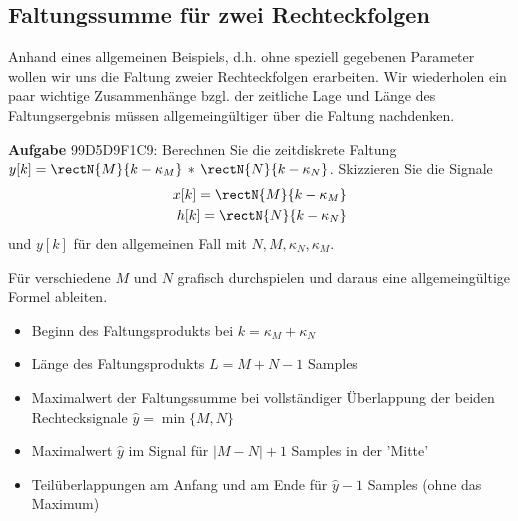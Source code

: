 \subsection{Faltungssumme für zwei Rechteckfolgen}
\label{sec:99D5D9F1C9}
\begin{Ziel}
Anhand eines allgemeinen Beispiels, d.h. ohne speziell gegebenen Parameter
wollen wir uns die Faltung zweier Rechteckfolgen erarbeiten.
Wir wiederholen ein paar wichtige Zusammenhänge bzgl. der zeitliche Lage und
Länge des Faltungsergebnis müssen allgemeingültiger über die Faltung nachdenken.
\end{Ziel}
\textbf{Aufgabe} {\tiny 99D5D9F1C9}: Berechnen Sie die zeitdiskrete Faltung
$y[k] = \rectN{M}{k-\kappa_M} \, \ast \,\rectN{N}{k-\kappa_N}$.
Skizzieren Sie die Signale
\begin{align}
x[k]=\rectN{M}{k-\kappa_M}\\
h[k] = \rectN{N}{k-\kappa_N}
\end{align}
und $y[k]$ für den allgemeinen Fall mit
$N,M, \kappa_N, \kappa_M$.
%
\begin{Ansatz}
Für verschiedene $M$ und $N$ grafisch durchspielen und
daraus eine allgemeingültige Formel ableiten.
\end{Ansatz}
%
\begin{ExCalc}
\begin{itemize}
\item Beginn des Faltungsprodukts bei $k=\kappa_M+\kappa_N$
\item Länge des Faltungsprodukts $L=M+N-1$ Samples
\item Maximalwert der Faltungssumme bei vollständiger Überlappung der beiden Rechtecksignale $\hat{y} = \min\{M,N\}$
\item Maximalwert $\hat{y}$ im Signal für $|M-N|+1$ Samples in der 'Mitte'
\item Teilüberlappungen am Anfang und am Ende für $\hat{y}-1$ Samples (ohne das Maximum)
\end{itemize}
\end{ExCalc}
